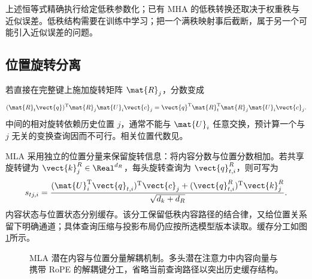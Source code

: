 \documentclass[../textbook.tex]{subfiles}
\begin{document}
上述恒等式精确执行给定低秩参数化；已有 MHA 的低秩转换还取决于权重秩与近似误差。低秩结构需要在训练中学习；把一个满秩映射事后截断，属于另一个可能引入近似误差的问题。

\subsection{位置旋转分离}
若直接在完整键上施加旋转矩阵 $\mat{R}_j$，分数变成
\begin{equation}
 (\mat{R}_t\vect{q})^{\mathrm{T}}\mat{R}_j\mat{U}_i\vect{c}_j
 =\vect{q}^{\mathrm{T}}\mat{R}_t^{\mathrm{T}}\mat{R}_j\mat{U}_i\vect{c}_j.
\end{equation}
中间的相对旋转依赖历史位置 $j$，通常不能与 $\mat{U}_i$ 任意交换，预计算一个与 $j$ 无关的变换查询因而不可行。相关位置代数见。

MLA 采用独立的位置分量来保留旋转信息：将内容分数与位置分数相加。若共享旋转键为 $\vect{k}_j^R\in\Real^{d_R}$，每头旋转查询为 $\vect{q}_{t,i}^R$，则可写为
\begin{equation}
 s_{tj,i}=\frac{(\mat{U}_i^{\mathrm{T}}\vect{q}_{t,i})^{\mathrm{T}}\vect{c}_j+
 (\vect{q}_{t,i}^{R})^{\mathrm{T}}\vect{k}_j^R}{\sqrt{d_k+d_R}}.
\end{equation}
内容状态与位置状态分别缓存。该分工保留低秩内容路径的结合律，又给位置关系留下明确通道；具体查询压缩与投影布局仍应按所选模型版本读取。缓存分工如图\ref{fig:open-mla-split}所示。

\begin{figure}[htbp]
\centering
{}
\caption[MLA 潜在内容与位置分量解耦机制]{MLA 潜在内容与位置分量解耦机制。多头潜在注意力中内容向量与携带 RoPE 的解耦键分工，省略当前查询路径以突出历史缓存结构。}\label{fig:open-mla-split}
\end{figure}
\end{document}
